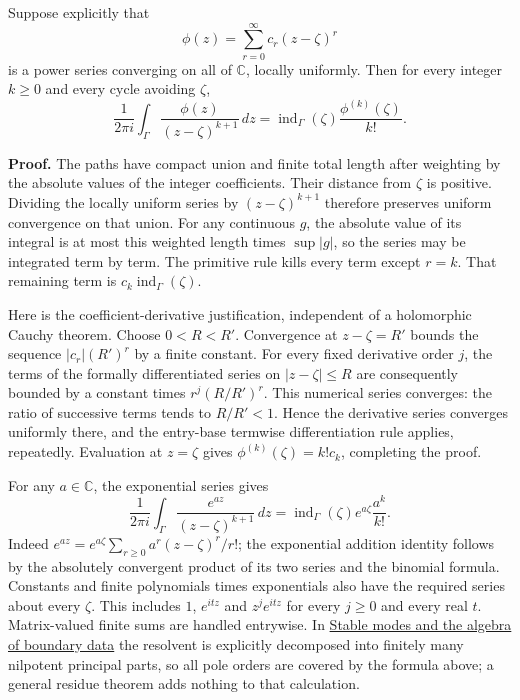 \documentclass[
  11pt,
]{article}
\begin{document}
Suppose explicitly that \[
\phi(z)=\sum_{r=0}^\infty c_r(z-\zeta)^r
\] is a power series converging on all of \(\mathbb C\), locally
uniformly. Then for every integer \(k\geq0\) and every cycle avoiding
\(\zeta\), \[
\frac{1}{2\pi i}\int_\Gamma
\frac{\phi(z)}{(z-\zeta)^{k+1}}\,dz
=\operatorname{ind}_\Gamma(\zeta)\frac{\phi^{(k)}(\zeta)}{k!}.
\]

\textbf{Proof.} The paths have compact union and finite total length
after weighting by the absolute values of the integer coefficients.
Their distance from \(\zeta\) is positive. Dividing the locally uniform
series by \((z-\zeta)^{k+1}\) therefore preserves uniform convergence on
that union. For any continuous \(g\), the absolute value of its integral
is at most this weighted length times \(\sup|g|\), so the series may be
integrated term by term. The primitive rule kills every term except
\(r=k\). That remaining term is \(c_k\operatorname{ind}_\Gamma(\zeta)\).

Here is the coefficient-derivative justification, independent of a
holomorphic Cauchy theorem. Choose \(0<R<R'\). Convergence at
\(z-\zeta=R'\) bounds the sequence \(|c_r|(R')^r\) by a finite constant.
For every fixed derivative order \(j\), the terms of the formally
differentiated series on \(|z-\zeta|\leq R\) are consequently bounded by
a constant times \(r^j(R/R')^r\). This numerical series converges: the
ratio of successive terms tends to \(R/R'<1\). Hence the derivative
series converges uniformly there, and the entry-base termwise
differentiation rule applies, repeatedly. Evaluation at \(z=\zeta\)
gives \(\phi^{(k)}(\zeta)=k!c_k\), completing the proof.

For any \(a\in\mathbb C\), the exponential series gives \[
\frac{1}{2\pi i}\int_\Gamma
\frac{e^{az}}{(z-\zeta)^{k+1}}\,dz
=\operatorname{ind}_\Gamma(\zeta)e^{a\zeta}\frac{a^k}{k!}.
\] Indeed \(e^{az}=e^{a\zeta}\sum_{r\geq0}a^r(z-\zeta)^r/r!\); the
exponential addition identity follows by the absolutely convergent
product of its two series and the binomial formula. Constants and finite
polynomials times exponentials also have the required series about every
\(\zeta\). This includes \(1\), \(e^{itz}\) and \(z^j e^{itz}\) for
every \(j\geq0\) and every real \(t\). Matrix-valued finite sums are
handled entrywise. In \href{stable-boundary-models.pdf}{Stable modes and
the algebra of boundary data} the resolvent is explicitly decomposed
into finitely many nilpotent principal parts, so all pole orders are
covered by the formula above; a general residue theorem adds nothing to
that calculation.
\end{document}
